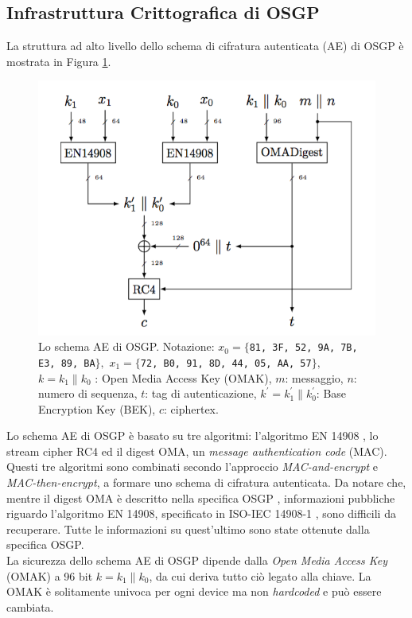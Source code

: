 \subsection{Infrastruttura Crittografica di OSGP}
La struttura ad alto livello dello schema di cifratura autenticata (AE) di OSGP è mostrata in Figura \ref{osgp_img}.
\begin{figure}[hbtp]
	\centering
	\includegraphics[scale=.5]{imgs/attack/osgp.png}
	\caption{Lo schema AE di OSGP. Notazione: $x_0 = \{${\tt 81, 3F, 52, 9A, 7B, E3, 89, BA}$\},$ $x_1 = \{${\tt 72, B0, 91, 8D, 44, 05, AA, 57}$\},$ $k = k_1 \| k_0$ : Open Media Access Key (OMAK), $m$: messaggio, $n$: numero di sequenza, $t$: tag di autenticazione, $k^\prime = k^{\prime}_{1} \| k^{\prime}_{0}$: Base Encryption Key (BEK), $c$: ciphertex.}
	\label{osgp_img}
\end{figure}
Lo schema AE di OSGP è basato su tre algoritmi: l'algoritmo EN 14908 \cite{standard14908}, lo stream cipher RC4 ed il digest OMA, un \emph{message authentication code} (MAC). Questi tre algoritmi sono combinati secondo l'approccio \textit{MAC-and-encrypt} e \textit{MAC-then-encrypt}, a formare uno schema di cifratura autenticata. Da notare che, mentre il digest OMA è descritto nella specifica OSGP \cite{osgp}, informazioni pubbliche riguardo l'algoritmo EN 14908, specificato in ISO-IEC 14908-1 \cite{standard14908}, sono difficili da recuperare. Tutte le informazioni su quest'ultimo sono state ottenute dalla specifica OSGP.\\
La sicurezza dello schema AE di OSGP dipende dalla \textit{Open Media Access Key} (OMAK) a 96 bit $k = k_1 \| k_0$, da cui deriva tutto ciò legato alla chiave. La OMAK è solitamente univoca per ogni device ma non \textit{hardcoded} e può essere cambiata.\\
